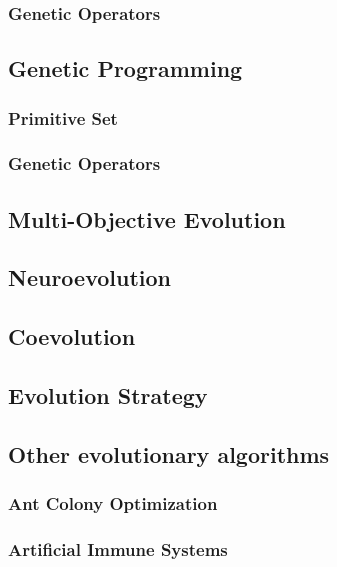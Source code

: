       \subsubsection{Genetic Operators}
      \label{sec:future:ga:operators}
        \Blindtext
    \subsection{Genetic Programming}
    \label{sec:future:gp}
      \subsubsection{Primitive Set}
      \label{sec:future:gp:primitive_set}
        \Blindtext
      \subsubsection{Genetic Operators}
      \label{sec:future:gp:operators}
        \Blindtext
    \subsection{Multi-Objective Evolution}
    \label{sec:future:moe}
      \Blindtext
    \subsection{Neuroevolution}
    \label{sec:future:ne}
      \Blindtext
    \subsection{Coevolution}
    \label{sec:future:coev}
      \Blindtext
    \subsection{Evolution Strategy}
    \label{sec:future:es}
      \Blindtext
    \subsection{Other evolutionary algorithms}
    \label{sec:future:other}
      \subsubsection{Ant Colony Optimization}
      \subsubsection{Artificial Immune Systems}
